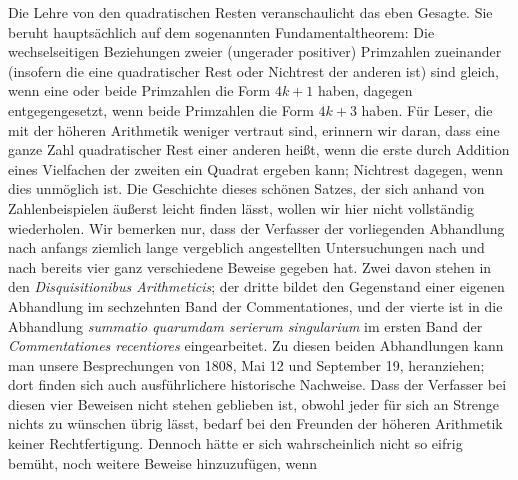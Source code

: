 Die Lehre von den quadratischen Resten veranschaulicht das eben Gesagte. Sie beruht hauptsächlich auf dem sogenannten Fundamentaltheorem: Die wechselseitigen Beziehungen zweier (ungerader positiver) Primzahlen zueinander (insofern die eine quadratischer Rest oder Nichtrest der anderen ist) sind gleich, wenn eine oder beide Primzahlen die Form $4k+1$ haben, dagegen entgegengesetzt, wenn beide Primzahlen die Form $4k+3$ haben. Für Leser, die mit der höheren Arithmetik weniger vertraut sind, erinnern wir daran, dass eine ganze Zahl quadratischer Rest einer anderen heißt, wenn die erste durch Addition eines Vielfachen der zweiten ein Quadrat ergeben kann; Nichtrest dagegen, wenn dies unmöglich ist. Die Geschichte dieses schönen Satzes, der sich anhand von Zahlenbeispielen äußerst leicht finden lässt, wollen wir hier nicht vollständig wiederholen. Wir bemerken nur, dass der Verfasser der vorliegenden Abhandlung nach anfangs ziemlich lange vergeblich angestellten Untersuchungen nach und nach bereits vier ganz verschiedene Beweise gegeben hat. Zwei davon stehen in den \emph{Disquisitionibus Arithmeticis}; der dritte bildet den Gegenstand einer eigenen Abhandlung im sechzehnten Band der Commentationes, und der vierte ist in die Abhandlung \emph{summatio quarumdam serierum singularium} im ersten Band der \emph{Commentationes recentiores} eingearbeitet. Zu diesen beiden Abhandlungen kann man unsere Besprechungen von 1808, Mai 12 und September 19, heranziehen; dort finden sich auch ausführlichere historische Nachweise. Dass der Verfasser bei diesen vier Beweisen nicht stehen geblieben ist, obwohl jeder für sich an Strenge nichts zu wünschen übrig lässt, bedarf bei den Freunden der höheren Arithmetik keiner Rechtfertigung. Dennoch hätte er sich wahrscheinlich nicht so eifrig bemüht, noch weitere Beweise hinzuzufügen, wenn
%
